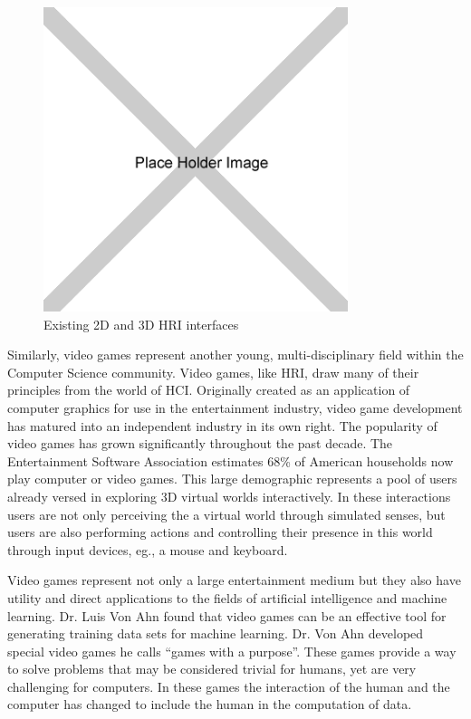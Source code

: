\begin{figure}[ht]
\begin{center}
\includegraphics[width=3.5in]{images/placeholder.png}
\caption{Existing 2D and 3D HRI interfaces\label{fig:existing-robot-ui}}
\end{center}
\end{figure}

Similarly, video games represent another young, multi-disciplinary field within the Computer Science community. Video games, like HRI, draw many of their principles from the world of HCI. Originally created as an application of computer graphics for use in the entertainment industry, video game development has matured into an independent industry in its own right. The popularity of video games has grown significantly throughout the past decade. The Entertainment Software Association estimates 68\% of American households now play computer or video games. \cite{ESA} This large demographic represents a pool of users already versed in exploring 3D virtual worlds interactively. In these interactions users are not only perceiving the a virtual world through simulated senses, but users are also performing actions and controlling their presence in this world through input devices, eg., a mouse and keyboard.

Video games represent not only a large entertainment medium but they also have utility and direct applications to the fields of artificial intelligence and machine learning. Dr. Luis Von Ahn found that video games can be an effective tool for generating training data sets for machine learning. \cite{GWAP} Dr. Von Ahn developed special video games he calls ``games with a purpose''.  These games provide a way to solve problems that may be considered trivial for humans, yet are very challenging for computers. In these games the interaction of the human and the computer has changed to include the human in the computation of data.

